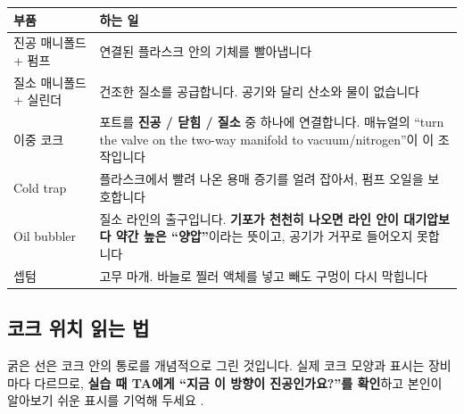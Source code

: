 \documentclass[10pt,a4paper]{article}
\begin{document}
\renewcommand{\arraystretch}{1.3}
\begin{tabularx}{\linewidth}{|l|X|}
\hline
\textbf{부품} & \textbf{하는 일} \\ \hline
진공 매니폴드 + 펌프 & 연결된 플라스크 안의 기체를 빨아냅니다 \\ \hline
질소 매니폴드 + 실린더 & 건조한 질소를 공급합니다. 공기와 달리 산소와 물이 없습니다 \\ \hline
이중 코크 & 포트를 \textbf{진공 / 닫힘 / 질소} 중 하나에 연결합니다. 매뉴얼의 ``turn the valve on the two-way manifold to vacuum/nitrogen''이 이 조작입니다 \\ \hline
Cold trap & 플라스크에서 빨려 나온 용매 증기를 얼려 잡아서, 펌프 오일을 보호합니다 \\ \hline
Oil bubbler & 질소 라인의 출구입니다. \textbf{기포가 천천히 나오면 라인 안이 대기압보다 약간 높은 ``양압''}이라는 뜻이고, 공기가 거꾸로 들어오지 못합니다 \\ \hline
셉텀 & 고무 마개. 바늘로 찔러 액체를 넣고 빼도 구멍이 다시 막힙니다 \\ \hline
\end{tabularx}
\renewcommand{\arraystretch}{1}

\subsection*{코크 위치 읽는 법}
\begin{center}
\end{center}
{\small 굵은 선은 코크 안의 통로를 개념적으로 그린 것입니다. 실제 코크 모양과 표시는 장비마다 다르므로, \textbf{실습 때 TA에게 ``지금 이 방향이 진공인가요?''를 확인}하고 본인이 알아보기 쉬운 표시를 기억해 두세요 .}
\end{document}
